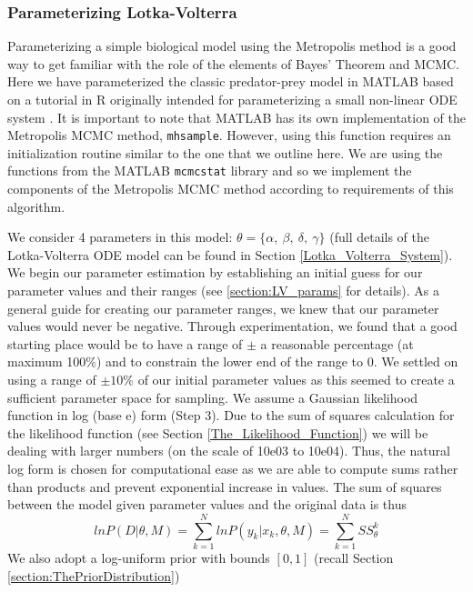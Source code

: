 \subsubsection{Parameterizing Lotka-Volterra} Parameterizing a simple biological model using the Metropolis method is a good way to get familiar with the role of the elements of Bayes' Theorem and MCMC. Here we have parameterized the classic predator-prey model in MATLAB based on a tutorial in R originally intended for parameterizing a small non-linear ODE system \cite{mcmcstatlib}. It is important to note that MATLAB has its own implementation of the Metropolis MCMC method, \texttt{mhsample}. However, using this function requires an initialization routine similar to the one that we outline here. We are using the functions from the MATLAB \texttt{mcmcstat} library \cite{mcmcstatlib} and so we implement the components of the Metropolis MCMC method according to requirements of this algorithm. 
\par We consider 4 parameters in this model: $\theta = \{ \alpha, \: \beta,\: \delta,\: \gamma \}$ (full details of the Lotka-Volterra ODE model can be found in Section \ref{Lotka_Volterra_System}). We begin our parameter estimation by establishing an initial guess for our parameter values and their ranges (see \ref{section:LV_params} for details). As a general guide for creating our parameter ranges, we knew that our parameter values would never be negative. Through experimentation, we found that a good starting place would be to have a range of $\pm$ a reasonable percentage (at maximum 100$\%$) and to constrain the lower end of the range to 0. We settled on using a range of $\pm 10\%$ of our initial parameter values as this seemed to create a sufficient parameter space for sampling. We assume a Gaussian likelihood function in log (base e) form (Step 3). Due to the sum of squares calculation for the likelihood function (see Section \ref{The_Likelihood_Function}) we will be dealing with larger numbers (on the scale of 10e03 to 10e04). Thus, the natural log form is chosen for computational ease as we are able to compute sums rather than products and prevent exponential increase in values. The sum of squares between the model given parameter values and the original data is thus
\begin{equation} \label{eq:13mcmc}
lnP(D|\theta, M) = \sum_{k=1}^{N}lnP(y_k|x_k,\theta,M) = \sum_{k=1}^N SS_\theta^k
\end{equation}
 We also adopt a log-uniform prior with bounds $[0,1]$ (recall Section \ref{section:ThePriorDistribution})

